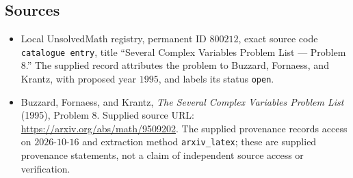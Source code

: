 \documentclass[11pt]{article}
\begin{document}
\subsection{Sources}
\begin{itemize}
\item Local UnsolvedMath registry, permanent ID \(800212\), exact source code \texttt{catalogue entry}, title ``Several Complex Variables Problem List --- Problem 8.'' The supplied record attributes the problem to Buzzard, Fornaess, and Krantz, with proposed year \(1995\), and labels its status \texttt{open}.
\item Buzzard, Fornaess, and Krantz, \emph{The Several Complex Variables Problem List} (1995), Problem 8. Supplied source URL: \url{https://arxiv.org/abs/math/9509202}. The supplied provenance records access on \(2026\text{-}10\text{-}16\) and extraction method \texttt{arxiv\_latex}; these are supplied provenance statements, not a claim of independent source access or verification.
\end{itemize}
\end{document}
